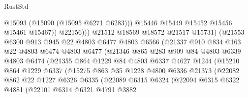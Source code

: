 \begin{lexlean}{RustStd}
\begin{coremodule}
                                @15093
                                (@15090 (@15095 @6271 @6283)))
                              @15446
                              @15449
                              @15452
                              @15456
                              @15461
                              @15467))
                          @22156)))
                    @21512
                    @18569
                    @18572
                    @21517
                    @15731)
                  (@21553
                    @6300
                    @913
                    @945
                    @22
                    @4803
                    @6477
                    @4803
                    @6566
                    (@21337
                      @910
                      @834
                      @163
                      @22
                      @4803
                      @6474
                      @4803
                      @6477
                      (@21346
                        @865
                        @283
                        @909
                        @84
                        @4803
                        @6339
                        @4803
                        @6474
                        (@21355
                          @864
                          @1229
                          @84
                          @4803
                          @6337
                          @4627
                          @1244
                          (@15210
                            @864
                            @1229
                            @6337
                            (@15275
                              @863
                              @35
                              @1228
                              @4800
                              @6336
                              @21373
                              (@22082
                                @862
                                @22
                                @1227
                                @6326
                                @6335
                                (@22089
                                  @6315
                                  @6324
                                  (@22094
                                    @6315
                                    @6322
                                    @4881
                                    (@22101
                                      @6314
                                      @6321
                                      @4791
                                      @3882

\end{coremodule}
\end{lexlean}
